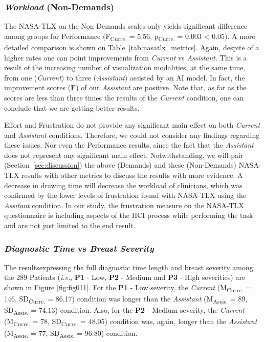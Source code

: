 \subsubsection{{\it Workload} (Non-Demands)}

The NASA-TLX on the Non-Demands scales only yields significant difference among groups for Performance (F\textsubscript{Curre.} = 5.56, p\textsubscript{Curre.} = 0.003 < 0.05).
A more detailed comparison is shown on Table~\ref{tab:nasatlx_metrics}.
Again, despite of a higher rates one can point improvements from {\it Current} vs {\it Assistant}.
This is a result of the increasing number of visualization modalities, at the same time, from one ({\it Current}) to three ({\it Assistant}) assisted by an AI model.
In fact, the improvement scores (\textbf{F}) of our {\it Assistant} are positive.
Note that, as far as the scores are less than three times the results of the {\it Current} condition, one can conclude that we are getting better results.

Effort and Frustration do not provide any significant main effect on both {\it Current} and {\it Assistant} conditions.
Therefore, we could not consider any findings regarding these issues.
Nor even the Performance results, since the fact that the {\it Assistant} does not represent any significant main effect.
Notwithstanding, we will pair (Section~\ref{sec:discussion}) the above (Demands) and these (Non-Demands) NASA-TLX results with other metrics to discuss the results with more evidence.
A decrease in drawing time will decrease the workload of clinicians, which was confirmed by the lower levels of frustration found with NASA-TLX using the {\it Assitant} condition.
In our study, the frustration measure on the NASA-TLX questionnaire is including aspects of the HCI process while performing the task and are not just limited to the end result.



\subsubsection{{\it Diagnostic Time} vs {\it Breast Severity}}

The results\footnotemark[13] expressing the full diagnostic time length and breast severity among the 289 Patients ({\em i.e.}, {\bf P1} - Low, {\bf P2} - Medium and {\bf P3} - High severities) are shown in Figure \ref{fig:fig011}.
For the {\bf P1} - Low severity, the {\it Current} (M\textsubscript{Curre.} = 146, SD\textsubscript{Curre.} = 86.17) condition was longer than the {\it Assistant} (M\textsubscript{Assis.} = 89, SD\textsubscript{Assis.} = 74.13) condition.
Also, for the {\bf P2} - Medium severity, the {\it Current} (M\textsubscript{Curre.} = 78, SD\textsubscript{Curre.} = 48.05) condition was, again, longer than the {\it Assistant} (M\textsubscript{Assis.} = 77, SD\textsubscript{Assis.} = 96.80) condition.

